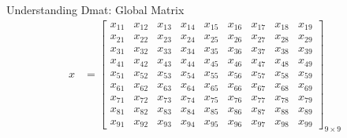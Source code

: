 \begin{frame}
\begin{exampleblock}{Understanding Dmat: Global Matrix}
\begin{align*}
x &= \left[
      \begin{array}{lllllllll}
      x_{11} & x_{12} & x_{13} & x_{14} & x_{15} & x_{16} & x_{17} & x	_{18} & x_{19}\\
      x_{21} & x_{22} & x_{23} & x_{24} & x_{25} & x_{26} & x_{27} & x	_{28} & x_{29}\\
      x_{31} & x_{32} & x_{33} & x_{34} & x_{35} & x_{36} & x_{37} & x	_{38} & x_{39}\\
      x_{41} & x_{42} & x_{43} & x_{44} & x_{45} & x_{46} & x_{47} & x	_{48} & x_{49}\\
      x_{51} & x_{52} & x_{53} & x_{54} & x_{55} & x_{56} & x_{57} & x	_{58} & x_{59}\\
      x_{61} & x_{62} & x_{63} & x_{64} & x_{65} & x_{66} & x_{67} & x	_{68} & x_{69}\\
      x_{71} & x_{72} & x_{73} & x_{74} & x_{75} & x_{76} & x_{77} & x	_{78} & x_{79}\\
      x_{81} & x_{82} & x_{83} & x_{84} & x_{85} & x_{86} & x_{87} & x	_{88} & x_{89}\\
      x_{91} & x_{92} & x_{93} & x_{94} & x_{95} & x_{96} & x_{97} & x	_{98} & x_{99}
      \end{array}
\right]_{9\times 9}
\end{align*}
\end{exampleblock}
\end{frame}



